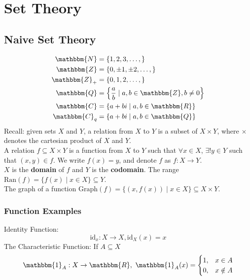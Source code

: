 \documentclass[10pt]{extarticle}
\title{}
\author{Avinash Iyer}
\date{}
\begin{document}
\tableofcontents
\pagebreak
\section{Set Theory}%
\subsection{Naive Set Theory}%
    \begin{align*}
      \mathbbm{N} &= \{1,2,3,\dots,\}\\
      \mathbbm{Z} &= \{0,\pm1,\pm2,\dots,\} \\
      \mathbbm{Z}_+ &= \{0,1,2,\dots,\}\\
      \mathbbm{Q} &= \left\{\frac{a}{b} \mid a,b\in\mathbbm{Z},b\neq 0\right\}\\
      \mathbbm{C} &= \{a+bi \mid a,b\in \mathbbm{R}\}\\
      \mathbbm{C}_q &= \{a+bi \mid a,b\in \mathbbm{Q}\}
    \end{align*}
    Recall: given sets $X$ and $Y$, a relation from $X$ to $Y$ is a subset of $X\times Y$, where $\times$ denotes the cartesian product of $X$ and $Y$.\\

    A relation $f\subseteq X\times Y$ is a function from $X$ to $Y$ such that $\forall x\in X$, $\exists!y\in Y$ such that $(x,y) \in f$. We write $f(x) = y$, and denote $f$ as $f:X\rightarrow Y$.\\

    $X$ is the \textbf{domain} of $f$ and $Y$ is the \textbf{codomain}. The range $\text{Ran}(f) = \{f(x)\mid x\in X\}\subseteq Y$. \\

    The graph of a function $\text{Graph}(f) = \{(x,f(x))\mid x\in X\} \subseteq X\times Y$.
    \subsubsection{Function Examples}%
    Identity Function:
      \[\text{id}_x: X\rightarrow X, \text{id}_X(x) = x\]
      The Characteristic Function: If $A\subseteq X$
      \[\mathbbm{1}_A: X\rightarrow \mathbbm{R}, ~\mathbbm{1}_A(x) = \begin{cases}
        1,&x\in A\\
        0,&x\notin A
      \end{cases}\]
\end{document}
